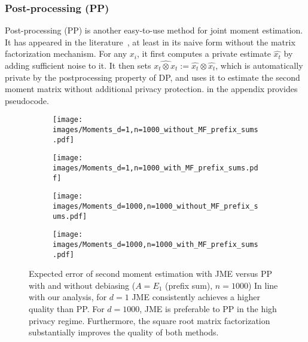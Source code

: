 \subsubsection{Post-processing (PP)} 
%
Post-processing (PP) is another easy-to-use method for joint moment estimation. It has appeared in the literature~\cite{dp_covariance_wishart_dist}, at least in its naive form without the matrix factorization mechanism. 
%
For any $x_i$, it first computes a private estimate $\widehat{x_t}$ by 
adding sufficient noise to it. 
%
It then sets $\widehat{x_t\otimes x_t}:=\widehat{x_t}\otimes \widehat{x_t}$, 
which is automatically private by the postprocessing property of DP, %
and uses it to estimate the second moment matrix without additional privacy protection.
%
 in the appendix provides pseudocode. 

\begin{figure*}[t]
    \begin{center}
        \begin{subfigure}[c]{0.24\textwidth}
        \texttt{[image: images/Moments\_d=1,n=1000\_without\_MF\_prefix\_sums.pdf]}
        \end{subfigure}
        \begin{subfigure}[c]{0.24\textwidth}
        \texttt{[image: images/Moments\_d=1,n=1000\_with\_MF\_prefix\_sums.pdf]}
        \end{subfigure}
        \begin{subfigure}[c]{0.24\textwidth}
        \texttt{[image: images/Moments\_d=1000,n=1000\_without\_MF\_prefix\_sums.pdf]}
        \end{subfigure}
        \begin{subfigure}[c]{0.24\textwidth}
        \texttt{[image: images/Moments\_d=1000,n=1000\_with\_MF\_prefix\_sums.pdf]}
        \end{subfigure}
    \caption{Expected error of second moment estimation with JME versus PP with and without debiasing ($A=E_1$ (prefix sum), $n=1000$)
    In line with our analysis, for $d=1$ JME consistently achieves a higher quality than PP. 
    For $d=1000$, JME is preferable to PP in the high privacy regime. 
    Furthermore, the square root matrix factorization substantially improves the quality of both methods.}
    \label{fig:moments_plot}
    \end{center}
\end{figure*}

